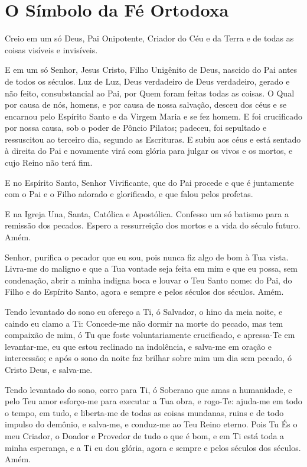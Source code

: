 \documentclass{subfiles}
\begin{document}
\section*{O Símbolo da Fé Ortodoxa}

Creio em um só Deus, Pai Onipotente, Criador do Céu e da Terra e de
todas as coisas visíveis e invisíveis.

E em um só Senhor, Jesus Cristo, Filho Unigênito de Deus, nascido do Pai antes
de todos os séculos. Luz de Luz, Deus verdadeiro de Deus verdadeiro, gerado e
não feito, consubstancial ao Pai, por Quem foram feitas todas as coisas. O Qual
por causa de nós, homens, e por causa de nossa salvação, desceu dos céus e se
encarnou pelo Espírito Santo e da Virgem Maria e se fez homem. E foi crucificado
por nossa causa, sob o poder de Pôncio Pilatos; padeceu, foi sepultado e
ressuscitou ao terceiro dia, segundo as Escrituras. E subiu aos céus e está
sentado à direita do Pai e novamente virá com glória para julgar os vivos e os
mortos, e cujo Reino não terá fim.

E no Espírito Santo, Senhor Vivificante, que do Pai procede e que é
juntamente com o Pai e o Filho adorado e glorificado, e que falou pelos
profetas.

E na Igreja Una, Santa, Católica e Apostólica. Confesso um só
batismo para a remissão dos pecados. Espero a ressurreição dos mortos e a
vida do século futuro. Amém.


Senhor, purifica o pecador que eu sou, pois nunca fiz algo de bom à Tua vista.
Livra-me do maligno e que a Tua vontade seja feita em mim e que eu possa, sem
condenação, abrir a minha indigna boca e louvar o Teu Santo nome: do Pai, do
Filho e do Espírito Santo, agora e sempre e pelos séculos dos séculos. Amém.


Tendo levantado do sono eu ofereço a Ti, ó Salvador, o hino da meia noite, e
caindo eu clamo a Ti: Concede-me não dormir na morte do pecado, mas tem
compaixão de mim, ó Tu que foste voluntariamente crucificado, e apressa-Te em
levantar-me, eu que estou reclinado na indolência, e salva-me em oração e
intercessão; e após o sono da noite faz brilhar sobre mim um dia sem pecado, ó
Cristo Deus, e salva-me.


Tendo levantado do sono, corro para Ti, ó Soberano que amas a humanidade, e pelo
Teu amor esforço-me para executar a Tua obra, e rogo-Te: ajuda-me em todo o
tempo, em tudo, e liberta-me de todas as coisas mundanas, ruins e de todo
impulso do demônio, e salva-me, e conduz-me ao Teu Reino eterno. Pois Tu És o
meu Criador, o Doador e Provedor de tudo o que é bom, e em Ti está toda a minha
esperança, e a Ti eu dou glória, agora e sempre e pelos séculos dos séculos.
Amém.
\end{document}
